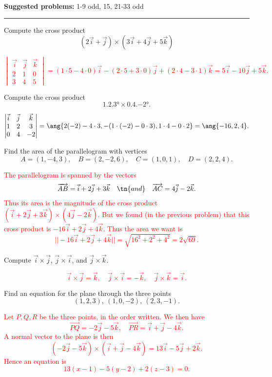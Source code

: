 \documentclass[12pt,reqno]{amsart}
\begin{document}
\textbf{Suggested problems:} 1-9 odd, 15, 21-33 odd

\bigskip
\hrule

\bigskip

\prob Compute the cross product
	\[(2\vec{i}+\vec{j}) \times (3\vec{i}+4\vec{j}+5\vec{k})
	\]

\bigskip
\textcolor{red}{
	\[
\begin{vmatrix} \vec{i} & \vec{j} & \vec{k} \\ 2 & 1 & 0 \\ 3 & 4 & 5 \end{vmatrix} = (1\cdot 5-4\cdot 0)\vec{i}-(2\cdot 5+3\cdot 0)\vec{j}+(2\cdot 4-3\cdot 1)\vec{k} =5\vec{i}-10\vec{j}+5\vec{k}.
	\]}	
	

\bigskip
\prob Compute the cross product
	\[\ang{1,2,3} \times \ang{0,4,-2}.
	\]
	
\bigskip
\textcolor{red}{
	\[
\begin{vmatrix} \vec{i} & \vec{j} & \vec{k} \\ 1 & 2 & 3 \\ 0 & 4 & -2 \end{vmatrix} = \ang{2(-2)-4\cdot 3,-(1\cdot (-2) - 0 \cdot 3), 1\cdot 4 - 0 \cdot 2} = \ang{-16,2,4}.
	\]}

\bigskip
\prob Find the area of the parallelogram with vertices
	\[A = (1,-4,3), \quad B=(2,-2,6), \quad C=(1,0,1), \quad D= ( 2,2,4).
	\]

\bigskip
\textcolor{red}{The parallelogram is spanned by the vectors
	\[\overrightarrow{AB} = \vec{i}+2\vec{j} + 3\vec{k} \quad \tn{and} \quad \overrightarrow{AC} = 4\vec{j} -2\vec{k}.
	\]
Thus its area is the magnitude of the cross product $(\vec{i} + 2\vec{j} + 3\vec{k}) \times (4\vec{j} -2 \vec{k})$. But we found (in the previous problem) that this cross product is $-16\vec{i} +2\vec{j} +4\vec{k}$. Thus the area we want is
	\[||-16\vec{i} +2\vec{j} +4\vec{k}|| = \sqrt{16^2 + 2^2 + 4^2} = 2\sqrt{69}.
	\]}

\bigskip
\prob Compute $\vec{i} \times \vec{j}$, $\vec{j} \times \vec{i}$, and $\vec{j} \times \vec{k}$.

\bigskip
\textcolor{red}{
	\[\vec{i} \times \vec{j} = \vec{k}, \quad \vec{j} \times \vec{i} = -\vec{k}, \quad \vec{j} \times \vec{k} = \vec{i}.
	\]}
\bigskip

\prob Find an equation for the plane through the three points
	\[(1,2,3), \ (1,0,-2), \ (2,3,-1).
	\]

\bigskip
\textcolor{red}{Let $P,Q,R$ be the three points, in the order written. We then have
	\[\overrightarrow{PQ} = -2\vec{j}-5\vec{k}, \quad \overrightarrow{PR} = \vec{i} +\vec{j} -4\vec{k}.
	\]
A normal vector to the plane is then
	\[(-2\vec{j}-5\vec{k}) \times (\vec{i} +\vec{j} -4\vec{k}) = 13\vec{i} -5\vec{j} +2\vec{k}.
	\]
Hence an equation is
	\[13(x-1) -5(y-2)+2(z-3) =0.
	\]}
\end{document}
